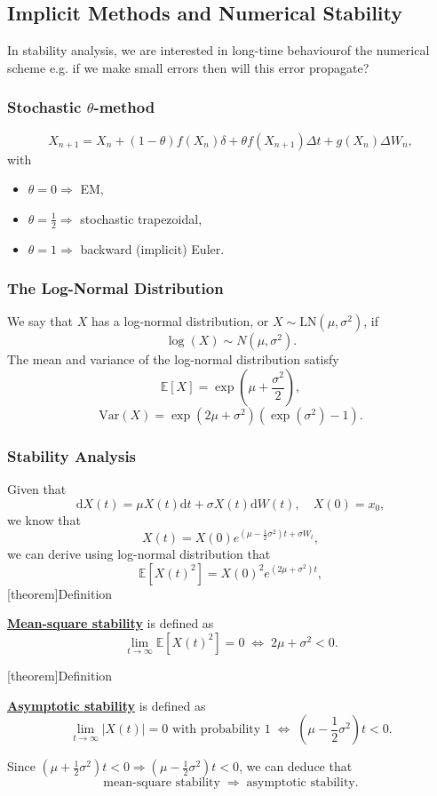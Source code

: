 \documentclass[twocolumn,landscape,10pt]{article}
\theoremstyle{definition}
\begin{document}
\subsection{Implicit Methods and Numerical Stability}

In stability analysis, we are interested in long-time behaviourof the numerical
scheme e.g. if we make small errors then will this error propagate?

\subsubsection{Stochastic $\theta$-method}

\[
    X_{n+1}=X_n+(1-\theta)f(X_n)\delta+\theta f(X_{n+1})\Delta t+g(X_n)\Delta
    W_n,
\]
with
\begin{itemize}
    \item $\theta = 0 \Rightarrow $ EM,
    \item $\theta=\frac{1}{2} \Rightarrow$ stochastic trapezoidal,
    \item $\theta=1 \Rightarrow$ backward (implicit) Euler.
\end{itemize}

\subsubsection{The Log-Normal Distribution}

We say that $X$ has a log-normal distribution, or $X\sim
\text{LN}(\mu,\sigma^2)$, if
\[
    \log{(X)}\sim N(\mu,\sigma^2).
\]
The mean and variance of the log-normal distribution satisfy
\[
    \mathbb{E}[X]=\exp{\left(\mu+\frac{\sigma^2}{2}\right)},
\]
\[
    \text{Var}(X)=\exp{\left(2\mu+\sigma^2\right)}\left(\exp{(\sigma^2)}-1\right).
\]

\subsubsection{Stability Analysis}

Given that
\[
    \mathrm{d}X(t)=\mu X(t)\mathrm{d}t+\sigma X(t)\mathrm{d}W(t),\quad
    X(0)=x_0,
\]
we know that
\[
    X(t)=X(0)e^{\left(\mu-\frac{1}{2}\sigma^2\right)t+\sigma W_t},
\]
we can derive using log-normal distribution that
\[
    \mathbb{E}[X(t)^2]=X(0)^2e^{(2\mu+\sigma^2)t},
\]
[theorem]{Definition}
\begin{mean-square stability}
\textbf{\underline{Mean-square stability}} is defined as
\[
    \underset{t\rightarrow\infty}{\lim}\mathbb{E}\left[X(t)^2\right]=0\;\iff\;
    2\mu+\sigma^2<0.
\]
\end{mean-square stability}
[theorem]{Definition}
\begin{asymptotic stability}
\textbf{\underline{Asymptotic stability}} is defined as
\[
    \underset{t\rightarrow\infty}{\lim}|X(t)|=0 \text{ with probability 1}
    \;\iff\;
    (\mu-\frac{1}{2}\sigma^2)t<0.
\]
\end{asymptotic stability}
Since $(\mu+\frac{1}{2}\sigma^2)t<0 \Rightarrow (\mu-\frac{1}{2}\sigma^2)t<0$,
we can deduce that
\[
    \text{mean-square stability}\;\Longrightarrow\;
    \text{asymptotic stability}.
\]
\end{document}
